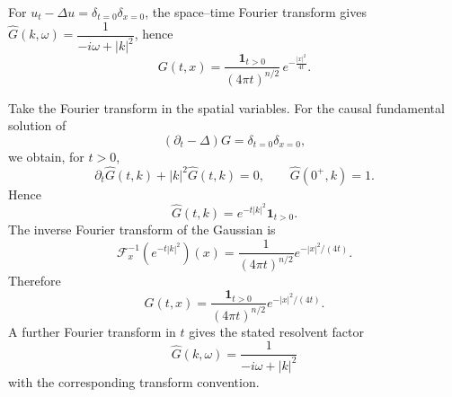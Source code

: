 \begin{problem}[CP-III-0015]
\label{prob:cp-iii-0015}
\begin{example}
		For $u_t-\Delta u=\delta_{t=0}\delta_{x=0}$, the space--time Fourier transform gives
		$\widehat{G}(k,\omega)=\dfrac{1}{-i\omega+|k|^2}$, hence
		\[
		G(t,x)=\frac{\mathbf{1}_{t>0}}{(4\pi t)^{n/2}}\,e^{-\frac{|x|^2}{4t}}.
		\]
	\end{example}
\end{problem}

\begin{solution}
Take the Fourier transform in the spatial variables.  For the causal
fundamental solution of
\[
(\partial_t-\Delta)G=\delta_{t=0}\delta_{x=0},
\]
we obtain, for \(t>0\),
\[
\partial_t\widehat G(t,k)+|k|^2\widehat G(t,k)=0,
\qquad
\widehat G(0^+,k)=1.
\]
Hence
\[
\widehat G(t,k)=e^{-t|k|^2}\mathbf1_{t>0}.
\]
The inverse Fourier transform of the Gaussian is
\[
\mathcal F_x^{-1}\!\left(e^{-t|k|^2}\right)(x)
=
\frac1{(4\pi t)^{n/2}}
e^{-|x|^2/(4t)}.
\]
Therefore
\[
\boxed{
G(t,x)
=
\frac{\mathbf1_{t>0}}{(4\pi t)^{n/2}}
e^{-|x|^2/(4t)}.
}
\]
A further Fourier transform in \(t\) gives the stated resolvent factor
\[
\widehat G(k,\omega)=\frac1{-i\omega+|k|^2}
\]
with the corresponding transform convention.
\end{solution}


